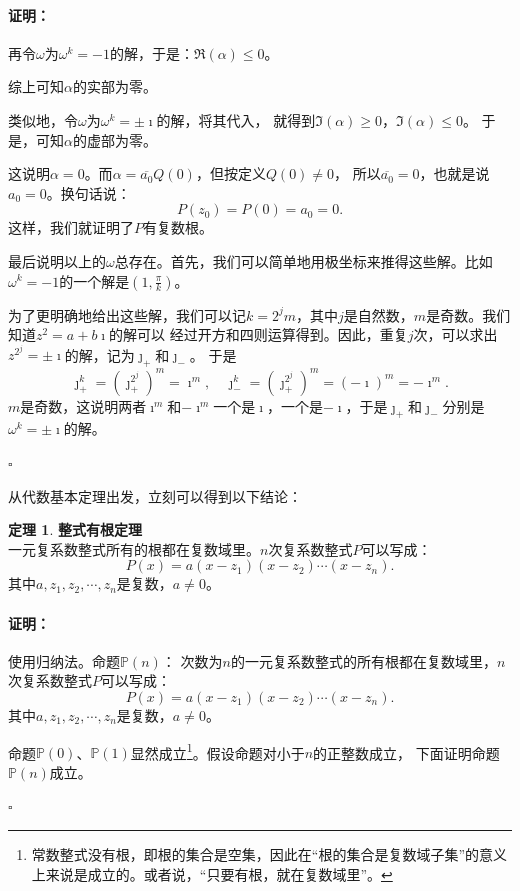 \documentclass[12pt,UTF8]{ctexbook}
\theoremstyle{definition}
\newtheorem{tm}{定理}[section]
\theoremstyle{plain}
\renewenvironment{proof}{\paragraph{\textbf{证明：}}}{\hfill$\square$}
\begin{document}
\begin{appendix}
\begin{proof}
    再令$\omega$为$\omega^k = -1$的解，于是：$\Re(\alpha) \leqslant 0$。%

    综上可知$\alpha$的实部为零。

    类似地，令$\omega$为$\omega^k = \pm \imath$的解，将其代入，%
    就得到$\Im(\alpha) \geqslant 0$，$\Im(\alpha) \leqslant 0$。
    于是，可知$\alpha$的虚部为零。

    这说明$\alpha = 0$。而$\alpha = \overline{a_0} Q(0)$，但按定义$Q(0)\neq 0$，
    所以$\overline{a_0} = 0$，也就是说$a_0 = 0$。换句话说：
    $$ P(z_0) = P(0) = a_0 = 0. $$
    这样，我们就证明了$P$有复数根。

    最后说明以上的$\omega$总存在。首先，我们可以简单地用极坐标来推得这些解。比如$\omega^k = -1$的一个解是$\left(1, \frac{\pi}{k}\right)$。
    
    为了更明确地给出这些解，我们可以记$k = 2^j m$，其中$j$是自然数，$m$是奇数。我们知道$z^2 = a + b\imath$的解可以
    经过开方和四则运算得到。因此，重复$j$次，可以求出$z^{2^j} = \pm \imath$的解，记为$\jmath_+$和$\jmath_-$。
    于是
    $$\jmath_+^k = \left(\jmath_+^{2^j}\right)^m = \imath^m, \quad \jmath_-^k = \left(\jmath_+^{2^j}\right)^m = (-\imath)^m = -\imath^m.$$
    $m$是奇数，这说明两者$\imath^m$和$-\imath^m$一个是$\imath$，一个是$-\imath$，于是$\jmath_+$和$\jmath_-$分别是$\omega^k = \pm \imath$的解。

\end{proof}

从代数基本定理出发，立刻可以得到以下结论：

\begin{tm}{\textbf{整式有根定理}}
    \mbox{} \\
    \indent 一元复系数整式所有的根都在复数域里。$n$次复系数整式$P$可以写成：
    $$ P(x) = a(x - z_1)(x - z_2)\cdots(x - z_n).$$
    其中$a, z_1, z_2,\cdots, z_n$是复数，$a\neq 0$。   
\end{tm}

\begin{proof}
    使用归纳法。命题$\mathbb{P}(n)$：
    次数为$n$的一元复系数整式的所有根都在复数域里，$n$次复系数整式$P$可以写成：
    $$ P(x) = a(x - z_1)(x - z_2)\cdots(x - z_n).$$
    其中$a, z_1, z_2,\cdots, z_n$是复数，$a\neq 0$。 

    命题$\mathbb{P}(0)$、$\mathbb{P}(1)$显然成立\footnote{常数整式没有根，即根的集合是空集，因此在“根的集合是复数域子集”的意义上来说是成立的。或者说，“只要有根，就在复数域里”。}。假设命题对小于$n$的正整数成立，
    下面证明命题$\mathbb{P}(n)$成立。


\end{proof}
\end{appendix}
\end{document}
